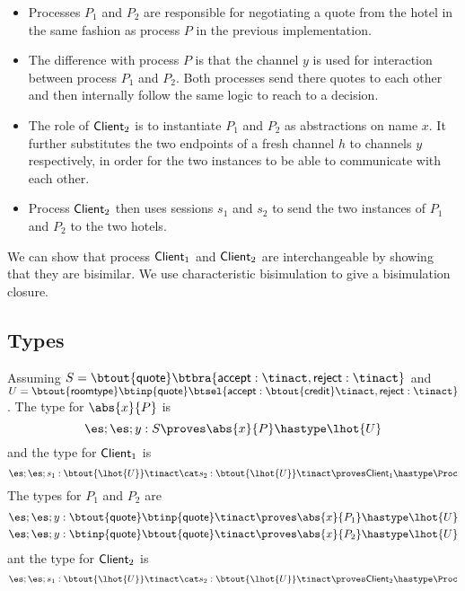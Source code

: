 \begin{itemize}
	\item	Processes $P_1$ and $P_2$ are responsible for negotiating a quote from the
		hotel in the same fashion as process $P$ in the previous implementation.

	\item	The difference with process $P$ is that the channel $y$ is used for
		interaction between process $P_1$ and $P_2$. Both processes send
		there quotes to each other and then internally follow the same
		logic to reach to a decision.

	\item	The role of $\mathsf{Client}_2$ is to instantiate $P_1$ and $P_2$ as abstractions
		on name $x$. It further substitutes
		the two endpoints of a fresh channel $h$ to channels $y$ respectively,
		in order for the two instances to be able to communicate with each other.

	\item	Process $\mathsf{Client}_2$ then uses sessions $s_1$ and $s_2$ to send the two
		instances of $P_1$ and $P_2$ to the two hotels.
\end{itemize}

We can show that process $\mathsf{Client}_1$ and $\mathsf{Client}_2$
are interchangeable by showing that they are bisimilar.
We use characteristic bisimulation to give a bisimulation
closure.
%

\subsection{Types}

Assuming $S = \btout{\Quote} \btbra{\accept: \tinact, \reject: \tinact}$ and
$U = \btout{\rtype} \btinp{\Quote} \btsel{\accept: \btout{\creditc} \tinact, \reject: \tinact }$.
The type for $\abs{x}{P}$ is
%
\[
	\es; \es; y: S \proves \abs{x}{P} \hastype \lhot{U}
\]
%
\noi and the type for $\mathsf{Client}_1$ is
%
\[
	\es; \es; s_1: \btout{\lhot{U}} \tinact \cat s_2: \btout{\lhot{U}} \tinact \proves \Client_1 \hastype \Proc
\]
%
The types for $P_1$ and $P_2$ are
%
\begin{eqnarray*}
	\es; \es; y: \btout{\Quote} \btinp{\Quote} \tinact \proves \abs{x}{P_1} \hastype \lhot{U}\\
	\es; \es; y: \btinp{\Quote} \btout{\Quote} \tinact \proves \abs{x}{P_2} \hastype \lhot{U}
\end{eqnarray*}
%
\noi ant the type for $\mathsf{Client}_2$ is
%
\[
	\es; \es; s_1: \btout{\lhot{U}} \tinact \cat s_2: \btout{\lhot{U}} \tinact \proves \Client_2 \hastype \Proc
\]
%
